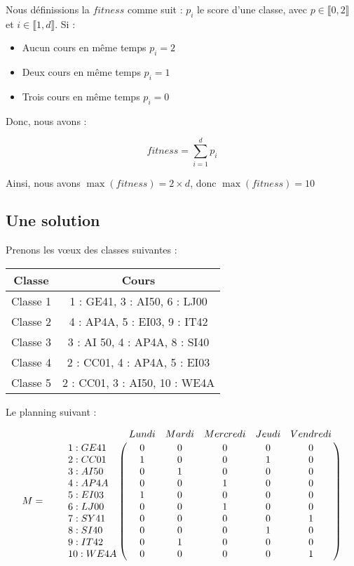 Nous définissions la $fitness$ comme suit : $p_i$ le score d'une classe, avec $p \in \llbracket 0 , 2 \rrbracket$ et $i \in \llbracket 1 , d \rrbracket$.
Si :
\begin{itemize}
    \item Aucun cours en même temps $p_i = 2$
    \item Deux cours en même temps $p_i = 1$
    \item Trois cours en même temps $p_i = 0$
\end{itemize}

Donc, nous avons :

\begin{equation}
    fitness = \sum_{i = 1}^{d} p_i\label{eq:fitness}
\end{equation}

Ainsi, nous avons $\max(fitness) = 2 \times d$, donc $\max(fitness) = 10$

\subsection{Une solution}

Prenons les v\oe ux des classes suivantes :

\begin{center}
    \begin{tabular}{|c|c|}
        \hline
        Classe   & Cours                         \\
        \hline
        Classe 1 & 1 : GE41, 3 : AI50, 6 : LJ00  \\
        \hline
        Classe 2 & 4 : AP4A, 5 : EI03, 9 : IT42  \\
        \hline
        Classe 3 & 3 : AI 50, 4 : AP4A, 8 : SI40 \\
        \hline
        Classe 4 & 2 : CC01, 4 : AP4A, 5 : EI03  \\
        \hline
        Classe 5 & 2 : CC01, 3 : AI50, 10 : WE4A \\
        \hline
    \end{tabular}
\end{center}

Le planning suivant :

\[
    M = \qquad \bordermatrix{~  & \tikzmark{harrowleft} Lundi & Mardi & Mercredi & Jeudi
    & Vendredi\tikzmark{harrowright}  \cr
    \tikzmark{varrowtop}
    1 : GE41 & 0 & 0 & 0 & 0 & 0 \cr
    2 : CC01 & 1 & 0 & 0 & 1 & 0 \cr
    3 : AI50 & 0 & 1 & 0 & 0 & 0 \cr
    4 : AP4A & 0 & 0 & 1 & 0 & 0 \cr
    5 : EI03 & 1 & 0 & 0 & 0 & 0 \cr
    6 : LJ00 & 0 & 0 & 1 & 0 & 0 \cr
    7 : SY41 & 0 & 0 & 0 & 0 & 1 \cr
    8 : SI40 & 0 & 0 & 0 & 1 & 0 \cr
    9 : IT42 & 0 & 1 & 0 & 0 & 0 \cr
    \tikzmark{varrowbottom} 10 : WE4A & 0 & 0 & 0 & 0 & 1 \cr
    }
\]

